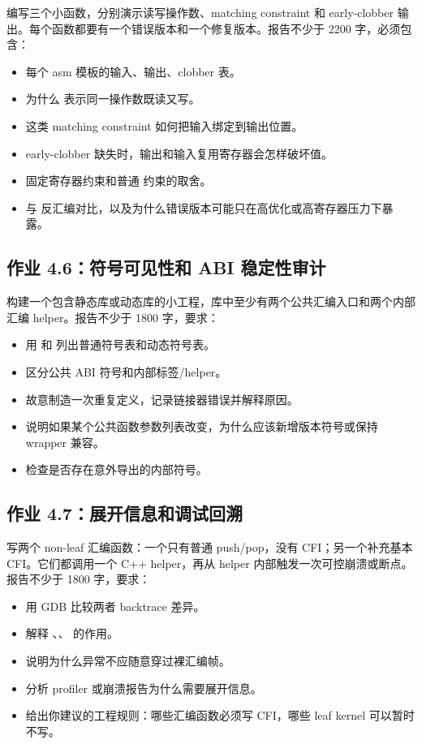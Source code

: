 \begin{exercisebox}
编写三个小函数，分别演示读写操作数、matching constraint 和 early-clobber 输出。每个函数都要有一个错误版本和一个修复版本。报告不少于 2200 字，必须包含：

\begin{itemize}
  \item 每个 asm 模板的输入、输出、clobber 表。
  \item 为什么  表示同一操作数既读又写。
  \item {} 这类 matching constraint 如何把输入绑定到输出位置。
  \item early-clobber 缺失时，输出和输入复用寄存器会怎样破坏值。
  \item 固定寄存器约束和普通  约束的取舍。
  \item {} 与  反汇编对比，以及为什么错误版本可能只在高优化或高寄存器压力下暴露。
\end{itemize}

\subsection*{作业 4.6：符号可见性和 ABI 稳定性审计}

构建一个包含静态库或动态库的小工程，库中至少有两个公共汇编入口和两个内部汇编 helper。报告不少于 1800 字，要求：

\begin{itemize}
  \item 用  和  列出普通符号表和动态符号表。
  \item 区分公共 ABI 符号和内部标签/helper。
  \item 故意制造一次重复定义，记录链接器错误并解释原因。
  \item 说明如果某个公共函数参数列表改变，为什么应该新增版本符号或保持 wrapper 兼容。
  \item 检查是否存在意外导出的内部符号。
\end{itemize}

\subsection*{作业 4.7：展开信息和调试回溯}

写两个 non-leaf 汇编函数：一个只有普通 push/pop，没有 CFI；另一个补充基本 CFI。它们都调用一个 C++ helper，再从 helper 内部触发一次可控崩溃或断点。报告不少于 1800 字，要求：

\begin{itemize}
  \item 用 GDB 比较两者 backtrace 差异。
  \item 解释 、、 的作用。
  \item 说明为什么异常不应随意穿过裸汇编帧。
  \item 分析 profiler 或崩溃报告为什么需要展开信息。
  \item 给出你建议的工程规则：哪些汇编函数必须写 CFI，哪些 leaf kernel 可以暂时不写。
\end{itemize}


\end{exercisebox}
